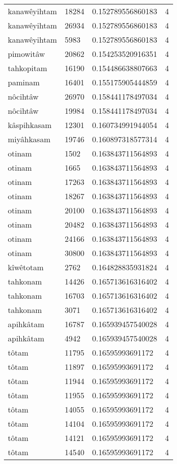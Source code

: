 \begin{longtable}{llll}
kanawêyihtam & 18284 & 0.152789556860183 & 4 \\
kanawêyihtam & 26934 & 0.152789556860183 & 4 \\
kanawêyihtam & 5983 & 0.152789556860183 & 4 \\
pimowitâw & 20862 & 0.154253520916351 & 4 \\
tahkopitam & 16190 & 0.154486638807663 & 4 \\
paminam & 16401 & 0.155175905444859 & 4 \\
nôcihtâw & 26970 & 0.158441178497034 & 4 \\
nôcihtâw & 19984 & 0.158441178497034 & 4 \\
kâspihkasam & 12301 & 0.160734991944054 & 4 \\
miyâhkasam & 19746 & 0.160897318577314 & 4 \\
otinam & 1502 & 0.163843711564893 & 4 \\
otinam & 1665 & 0.163843711564893 & 4 \\
otinam & 17263 & 0.163843711564893 & 4 \\
otinam & 18267 & 0.163843711564893 & 4 \\
otinam & 20100 & 0.163843711564893 & 4 \\
otinam & 20482 & 0.163843711564893 & 4 \\
otinam & 24166 & 0.163843711564893 & 4 \\
otinam & 30800 & 0.163843711564893 & 4 \\
kîwêtotam & 2762 & 0.164828835931824 & 4 \\
tahkonam & 14426 & 0.165713616316402 & 4 \\
tahkonam & 16703 & 0.165713616316402 & 4 \\
tahkonam & 3071 & 0.165713616316402 & 4 \\
apihkâtam & 16787 & 0.165939457540028 & 4 \\
apihkâtam & 4942 & 0.165939457540028 & 4 \\
tôtam & 11795 & 0.16595993691172 & 4 \\
tôtam & 11897 & 0.16595993691172 & 4 \\
tôtam & 11944 & 0.16595993691172 & 4 \\
tôtam & 11955 & 0.16595993691172 & 4 \\
tôtam & 14055 & 0.16595993691172 & 4 \\
tôtam & 14104 & 0.16595993691172 & 4 \\
tôtam & 14121 & 0.16595993691172 & 4 \\
tôtam & 14540 & 0.16595993691172 & 4 \\

\end{longtable}
